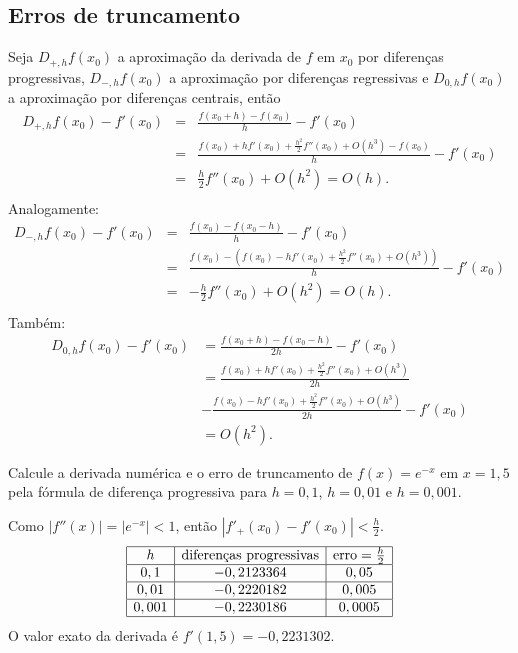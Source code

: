 \subsection{Erros de truncamento}
Seja $D_{+,h}f(x_0)$ a aproximação da derivada de $f$ em $x_0$ por diferenças progressivas, $D_{-,h}f(x_0)$ a aproximação por diferenças regressivas e $D_{0,h}f(x_0)$ a aproximação por diferenças centrais, então
\begin{eqnarray*}
D_{+,h}f(x_0)-f'(x_0)&=&\frac{f(x_0+h)-f(x_0)}{h}-f'(x_0)\\
&=&\frac{f(x_0)+hf'(x_0)+\frac{h^2}{2}f''(x_0)+O(h^3)-f(x_0)}{h}-f'(x_0)\\
&=&\frac{h}{2}f''(x_0)+O(h^2)=O(h).\\
\end{eqnarray*}
Analogamente:
\begin{eqnarray*}
D_{-,h}f(x_0)-f'(x_0)&=&\frac{f(x_0)-f(x_0-h)}{h}-f'(x_0)\\
&=&\frac{f(x_0)-\left(f(x_0)-hf'(x_0)+\frac{h^2}{2}f''(x_0)+O(h^3)\right)}{h}-f'(x_0)\\
&=&-\frac{h}{2}f''(x_0)+O(h^2)=O(h).\\
\end{eqnarray*}
Também:
\begin{align*}
D_{0,h}f(x_0)-f'(x_0)&= \frac{f(x_0+h)-f(x_0-h)}{2h}-f'(x_0)\\
&= \frac{f(x_0)+hf'(x_0)+\frac{h^2}{2}f''(x_0)+O(h^3)}{2h} \\
&- \frac{f(x_0)-hf'(x_0)+\frac{h^2}{2}f''(x_0)+O(h^3)}{2h}-f'(x_0)\\
&= O(h^2).
\end{align*}

\begin{ex}
Calcule a derivada numérica e o erro de truncamento de $f(x)=e^{-x}$ em $x=1,5$ pela fórmula de diferença progressiva para $h=0,1$, $h=0,01$ e $h=0,001$.
\end{ex}
\begin{sol}
Como $|f''(x)|=|e^{-x}|<1$, então $|f'_+(x_0)-f'(x_0)|<\frac{h}{2}$.
$$
\begin{array}{|c|c|c|}
\hline
 h&\hbox{diferenças progressivas} & \hbox{erro}=\frac{h}{2}\\
\hline
0,1&- 0,2123364 & 0,05\\
\hline
0,01 &- 0,2220182 & 0,005\\
\hline
0,001 &- 0,2230186 & 0,0005\\
\hline
\end{array}
$$
O valor exato da derivada é $f'(1,5)=-0,2231302$.
\end{sol}

